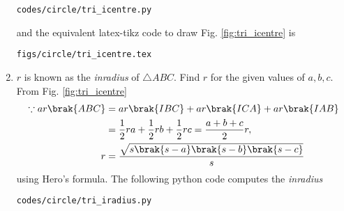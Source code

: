 \begin{enumerate}[label=\arabic*.,ref=\thesubsection.\theenumi]
\begin{lstlisting}
codes/circle/tri_icentre.py
\end{lstlisting}
%
and the equivalent latex-tikz code to draw Fig. \ref{fig:tri_icentre} is
%
\begin{lstlisting}
figs/circle/tri_icentre.tex
\end{lstlisting}
%
%
\item $r$ is known as the {\em inradius} of $\triangle ABC$.  Find $r$ for  the given values of $a,b,c$.
\\
\solution From Fig. \ref{fig:tri_icentre}
%
\begin{align}
\because ar\brak{ABC} &= ar\brak{IBC}+ar\brak{ICA}+ar\brak{IAB}
\\
&=\frac{1}{2}ra+\frac{1}{2}rb+\frac{1}{2}rc = \frac{a+b+c}{2}r,
\\
r &= \frac{\sqrt{s\brak{s-a}\brak{s-b}\brak{s-c}}}{s}
\end{align}
%
using Hero's formula.
%
The following python code computes the {\em inradius}
%
\begin{lstlisting}
codes/circle/tri_iradius.py
\end{lstlisting}

\end{enumerate}

